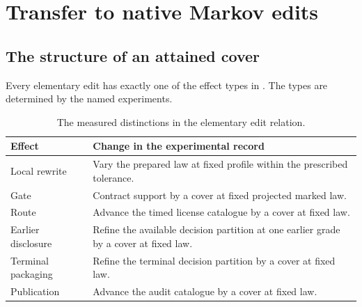 \section{Transfer to native Markov edits}\label{sec:native}

\subsection{The structure of an attained cover}

\begin{proposition}\label{prop:effects}
Every elementary edit has exactly one of the effect types in
. The types are determined by the named experiments.
\end{proposition}

\begin{table}[ht]
\centering
\small
\begin{tabularx}{\linewidth}{@{}lX@{}}
\toprule
Effect & Change in the experimental record\\
\midrule
Local rewrite & Vary the prepared law at fixed profile within the prescribed tolerance.\\
Gate & Contract support by a cover at fixed projected marked law.\\
Route & Advance the timed license catalogue by a cover at fixed law.\\
Earlier disclosure & Refine the available decision partition at one earlier grade by a cover at fixed law.\\
Terminal packaging & Refine the terminal decision partition by a cover at fixed law.\\
Publication & Advance the audit catalogue by a cover at fixed law.\\
\bottomrule
\end{tabularx}
\caption{The measured distinctions in the elementary edit relation.}
\label{tab:effects}
\end{table}

